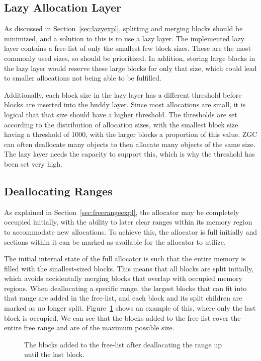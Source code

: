 \subsection{Lazy Allocation Layer}
As discussed in Section~\ref{sec:lazyexpl}, splitting and merging blocks should be minimized, and a solution to this is to use a lazy layer. The implemented lazy layer contains a free-list of only the smallest few block sizes. These are the most commonly used sizes, so should be prioritized. In addition, storing large blocks in the lazy layer would reserve these large blocks for only that size, which could lead to smaller allocations not being able to be fulfilled. 

Additionally, each block size in the lazy layer has a different threshold before blocks are inserted into the buddy layer. Since most allocations are small, it is logical that that size should have a higher threshold. The thresholds are set according to the distribution of allocation sizes, with the smallest block size having a threshold of $1 000$, with the larger blocks a proportion of this value. ZGC can often deallocate many objects to then allocate many objects of the same size. The lazy layer needs the capacity to support this, which is why the threshold has been set very high. 

\subsection{Deallocating Ranges}
As explained in Section~\ref{sec:freerangeexpl}, the allocator may be completely occupied initially, with the ability to later clear ranges within its memory region to accommodate new allocations. To achieve this, the allocator is full initially and sections within it can be marked as available for the allocator to utilize.

The initial internal state of the full allocator is such that the entire memory is filled with the smallest-sized blocks. This means that all blocks are split initially, which avoids accidentally merging blocks that overlap with occupied memory regions. When deallocating a specific range, the largest blocks that can fit into that range are added in the free-list, and each block and its split children are marked as no longer split. Figure~\ref{fig:deallocrange} shows an example of this, where only the last block is occupied. We can see that the blocks added to the free-list cover the entire free range and are of the maximum possible size.

\begin{figure}[H]
    \centering
    
    \caption{The blocks added to the free-list after deallocating the range up until the last block.}
    \label{fig:deallocrange}
\end{figure}

